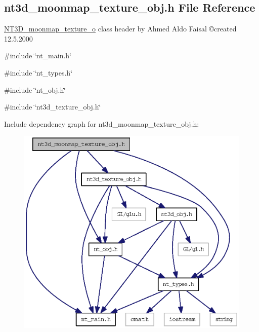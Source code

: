 \subsection{nt3d\_\-moonmap\_\-texture\_\-obj.h File Reference}
\label{nt3d__moonmap__texture__obj_8h}



\begin{DoxyItemize}
\item \hyperlink{class_n_t3_d__moonmap__texture__o}{NT3D\_\-moonmap\_\-texture\_\-o} class header by Ahmed Aldo Faisal \copyright created 12.5.2000 
\end{DoxyItemize} 


{\ttfamily \#include \char`\"{}nt\_\-main.h\char`\"{}}\par
{\ttfamily \#include \char`\"{}nt\_\-types.h\char`\"{}}\par
{\ttfamily \#include \char`\"{}nt\_\-obj.h\char`\"{}}\par
{\ttfamily \#include \char`\"{}nt3d\_\-texture\_\-obj.h\char`\"{}}\par
Include dependency graph for nt3d\_\-moonmap\_\-texture\_\-obj.h:
\nopagebreak
\begin{figure}[H]
\begin{center}
\leavevmode
\includegraphics[width=393pt]{nt3d__moonmap__texture__obj_8h__incl}
\end{center}
\end{figure}
